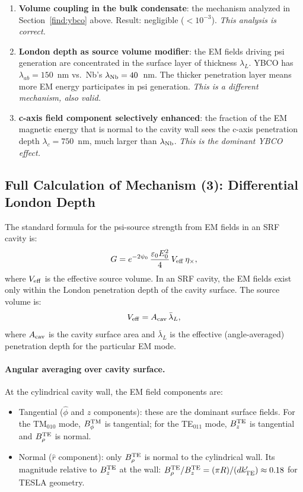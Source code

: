 \documentclass[11pt]{article}
\begin{document}
\begin{enumerate}
\item \textbf{Volume coupling in the bulk condensate}: the mechanism analyzed
in Section~\ref{find:ybco} above. Result: negligible ($< 10^{-3}$).
\textit{This analysis is correct.}

\item \textbf{London depth as source volume modifier}: the EM fields driving
psi generation are concentrated in the surface layer of thickness $\lambda_L$.
YBCO has $\lambda_{ab} = 150$~nm vs.\ Nb's $\lambda_{\rm Nb} = 40$~nm.
The thicker penetration layer means more EM energy participates in psi generation.
\textit{This is a different mechanism, also valid.}

\item \textbf{c-axis field component selectively enhanced}: the fraction of
the EM magnetic energy that is normal to the cavity wall sees the c-axis
penetration depth $\lambda_c = 750$~nm, much larger than $\lambda_{\rm Nb}$.
\textit{This is the dominant YBCO effect.}
\end{enumerate}

\subsection{Full Calculation of Mechanism (3): Differential London Depth}

The standard formula for the psi-source strength from EM fields in an SRF
cavity is:
\begin{equation}
G = e^{-2\psi_0}\,\frac{\varepsilon_0 E_0^2}{4}\,V_{\rm eff}\,\eta_\times,
\end{equation}
where $V_{\rm eff}$ is the effective source volume. In an SRF cavity,
the EM fields exist only within the London penetration depth of the cavity
surface. The source volume is:
\begin{equation}
V_{\rm eff} = A_{\rm cav}\,\bar{\lambda}_L,
\end{equation}
where $A_{\rm cav}$ is the cavity surface area and $\bar{\lambda}_L$
is the effective (angle-averaged) penetration depth for the particular
EM mode.

\paragraph{Angular averaging over cavity surface.}

At the cylindrical cavity wall, the EM field components are:
\begin{itemize}
\item Tangential ($\hat{\phi}$ and $\hat{z}$ components): these are the dominant
surface fields. For the TM$_{010}$ mode, $B_\phi^{\rm TM}$ is tangential;
for the TE$_{011}$ mode, $B_z^{\rm TE}$ is tangential and $B_\rho^{\rm TE}$
is normal.
\item Normal ($\hat{r}$ component): only $B_\rho^{\rm TE}$ is normal to the
cylindrical wall. Its magnitude relative to $B_z^{\rm TE}$ at the wall:
$B_\rho^{\rm TE}/B_z^{\rm TE} = (\pi R)/(d k_{\rm TE}') \approx 0.18$ for
TESLA geometry.
\end{itemize}
\end{document}
